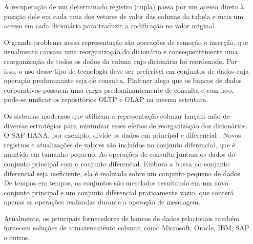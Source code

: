 A recuperação de um determinado registro (tupla) passa por um acesso direto à posição dele em cada uma dos vetores de valor das colunas da tabela e mais um acesso em cada dicionário para traduzir a codificação no valor original.

O grande problema nessa representação são operações de remoção e inserção, que usualmente causam uma reorganização do dicionário e consequentemente uma reorganização de todos os dados da coluna cujo dicionário foi reordenado. Por isso, o uso desse tipo de tecnologia deve ser preferível em conjuntos de dados cuja operação predominante seja de consulta. Plattner \cite{plattner2009common} alega que os bancos de dados corporativos possuem uma carga predominantemente de consulta e com isso, pode-se unificar os repositórios OLTP e OLAP na mesma estrutura. 

Os sistemas modernos que utilizam a representação colunar lançam mão de diversas estratégias para minimizar esses efeitos de reorganização dos dicionários. O SAP HANA, por exemplo, divide os dados em principal e diferencial \cite{plattner2012memory}. Novos registros e atualizações de valores são incluídos no conjunto diferencial, que é mantido em tamanho pequeno. As operações de consulta juntam os dados do conjunto principal com o conjunto diferencial. Embora a busca no conjunto diferencial seja ineficiente, ela é realizada sobre um conjunto pequeno de dados. De tempos em tempos, os conjuntos são mesclados resultando em um novo conjunto principal e um conjunto diferencial praticamente vazio, que conterá apenas as operações realizadas durante a operação de mesclagem.

Atualmente, os principais fornecedores de bancos de dados relacionais também fornecem soluções de armazenamento colunar, como Microsoft, Oracle, IBM, SAP e outros.  




